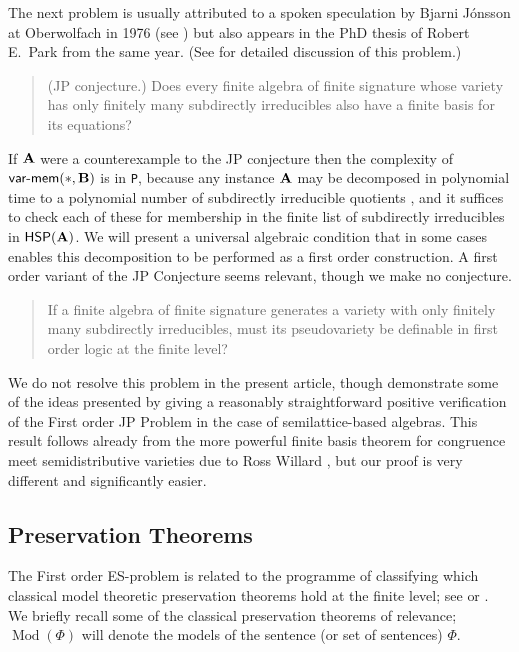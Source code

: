 \documentclass[reqno]{amsart}
\theoremstyle{plain}
\theoremstyle{definition}
\newcommand{\varmem}{\textsf{var-mem}}
\newcommand{\Mod}{\operatorname{Mod}}
\begin{document}
The next problem is usually attributed to a spoken speculation by Bjarni J\'onsson at Oberwolfach in 1976 (see \cite[pp.~256]{jacmcn}) but also appears in the PhD thesis of Robert E.~Park \cite{par} from the same year.  (See \cite{wilFBP} for detailed discussion of this problem.)
\begin{quotation}
 (JP conjecture.) Does every finite algebra of finite signature whose variety has only finitely many subdirectly irreducibles also have a finite basis for its equations?
\end{quotation}
If ${\bf A}$ were a counterexample  to the JP conjecture then the complexity of $\varmem(*,{\bf B})$ is in \texttt{P}, because any instance ${\bf A}$ may be decomposed in polynomial time to a polynomial number of subdirectly irreducible quotients \cite{DDK}, and it suffices to check each of these for membership in the finite list of subdirectly irreducibles in $\mathsf{HSP}({\bf A})$.  We will present a universal algebraic condition that in some cases enables this decomposition to be performed as a first order construction.  
A first order variant of the JP Conjecture seems relevant, though we make no conjecture. 
\begin{quotation}
 If a finite algebra of finite signature generates a variety with only finitely many subdirectly irreducibles, must its pseudovariety be definable in first order logic at the finite level?
\end{quotation}
We do not resolve this problem in the present article, though demonstrate some of the ideas presented by giving a reasonably straightforward positive verification of the First order JP Problem in the case of semilattice-based algebras.  This result follows already from the more powerful finite basis theorem for congruence meet semidistributive varieties due to Ross Willard \cite{wil2}, but our proof is very different and significantly easier.


\subsection{Preservation Theorems}\label{subsec:preservation}
The First order ES-problem is related to the programme of classifying which classical model theoretic preservation theorems hold at the finite level; see \cite{alegur} or \cite[\S2]{rosen}.   We briefly recall some of the classical preservation theorems of relevance; $\Mod(\Phi)$ will denote the models of the sentence (or set of sentences) $\Phi$.
\medskip
\end{document}

